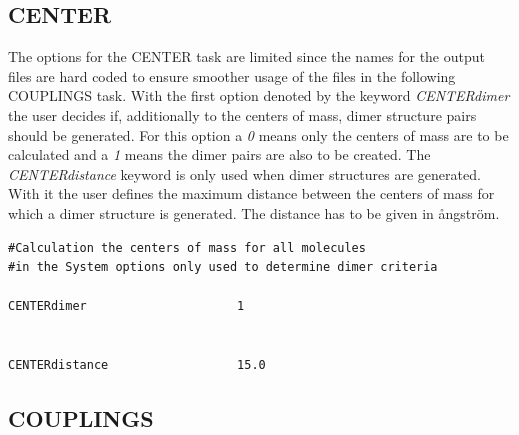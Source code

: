 \documentclass[10pt,a4paper]{article} %
\begin{document}
	\subsection{CENTER}
	
	The options for the CENTER task are limited since the names for the output files are hard coded to ensure smoother usage of the files in the following COUPLINGS task. With the first option denoted by the keyword \textit{CENTERdimer} the user decides if, additionally to the centers of mass, dimer structure pairs should be generated.
For this option a \textit{0} means only the centers of mass are to be calculated and a \textit{1} means the dimer pairs are also to be created. The \textit{CENTERdistance} keyword is only used when dimer structures are generated. With it the user defines the maximum distance between the centers of mass for which a dimer structure is generated. The distance has to be given in \aa ngström.\\
\begin{lstlisting}
#Calculation the centers of mass for all molecules
#in the System options only used to determine dimer criteria

CENTERdimer                     1


CENTERdistance                  15.0 
\end{lstlisting}

	\subsection{COUPLINGS}
	
\end{document}
